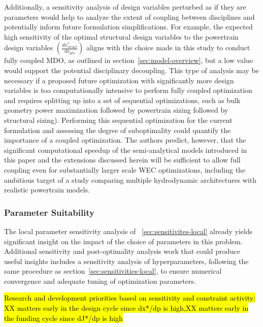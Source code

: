 Additionally, a sensitivity analysis of design variables perturbed as if they are parameters would help to analyze the extent of coupling between disciplines and potentially inform future formulation simplifications.
For example, the expected high sensitivity of the optimal structural design variables to the powertrain design variables $\left(\frac{dx^*_{struct}}{dx_{pto}}\right)$ aligns with the choice made in this study to conduct fully coupled MDO, as outlined in section~\ref{sec:model-overview}, but a low value would support the potential disciplinary decoupling.
This type of analysis may be necessary if a proposed future optimization with significantly more design variables is too computationally intensive to perform fully coupled optimization and requires splitting up into a set of sequential optimizations, such as bulk geometry power maximization followed by powertrain sizing followed by structural sizing).
Performing this sequential optimization for the current formulation and assessing the degree of suboptimality could quantify the importance of a coupled optimization.
The authors predict, however, that the significant computational speedup of the semi-analytical models introduced in this paper and the extensions discussed herein will be sufficient to allow full coupling even for substantially larger scale WEC optimizations, including the ambitious target of a study comparing multiple hydrodynamic architectures with realistic powertrain models.

\subsubsection{Parameter Suitability}
The local parameter sensitivity analysis of \sectionautorefname~\ref{sec:sensitivites-local} already yields significant insight on the impact of the choice of parameters in this problem.
Additional sensitivity and post-optimality analysis work that could produce useful insights includes a sensitivity analysis of hyperparameters, following the same procedure as section~\ref{sec:sensitivities-local}, to ensure numerical convergence and adequate tuning of optimization parameters.

\hl{Research and development priorities based on sensitivity and constraint activity: XX matters early in the design cycle since dx*/dp is high,XX matters early in the funding cycle since dJ*/dp is high}

